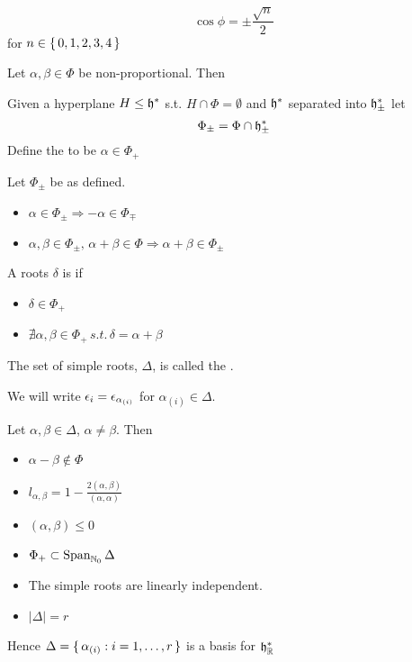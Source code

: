 \documentclass{article}
\begin{document}
\begin{theorem}
	\[
	\cos\phi=\pm\frac{\sqrt{n}}{2}
	\]
	for $n\in\set{  0,1,2,3,4  }$
\end{theorem}
\begin{lemma}
	Let $\alpha,\beta \in \Phi$ be non-proportional. Then 
\end{lemma}

\begin{definition}
	Given a hyperplane $H\leq\mathfrak{h}^\ast$ s.t. $H\cap\Phi=\emptyset$ and $\mathfrak{h}^\ast$ separated into $\mathfrak{h}^\ast_\pm$ let 
	\[
	\Phi_\pm=\Phi\cap\mathfrak{h}^\ast_\pm
	\]
	Define the  to be $\alpha\in\Phi_+$
\end{definition}

\begin{fact} Let $\Phi_\pm$ be as defined.
	\begin{itemize}
		\item $\alpha\in\Phi_\pm \Rightarrow -\alpha\in\Phi_\mp$
		\item $\alpha,\beta\in\Phi_\pm,\, \alpha+\beta\in\Phi \Rightarrow \alpha+\beta\in\Phi_\pm$
	\end{itemize}
\end{fact}

\begin{definition}
	A roots $\delta$ is  if 
	\begin{itemize}
		\item $\delta\in\Phi_+$
		\item $\nexists \alpha,\beta\in\Phi_+ \, s.t. \, \delta=\alpha+\beta$
	\end{itemize}
	The set of simple roots, $\Delta$, is called the .
\end{definition}

\begin{notation}
	We will write $\epsilon_i = \epsilon_{\alpha_{(i)}}$ for $\alpha_{(i)} \in \Delta$. 
\end{notation}

\begin{theorem}
	Let $\alpha,\beta\in\Delta$, $\alpha\neq\beta$. Then
	\begin{itemize}
		\item $\alpha-\beta\notin\Phi$
		\item $l_{\alpha,\beta}=1-\frac{2(\alpha,\beta)}{(\alpha,\alpha)}$
		\item $(\alpha,\beta)\leq0$
		\item $\Phi_+\subset\operatorname{Span}_{\mathbb{N}_0}\Delta$
		\item The simple roots are linearly independent.
		\item $|\Delta|=r$
	\end{itemize}
	Hence $\Delta=\set{  \alpha_{(i)} : i=1,\dots,r  }$ is a basis for $\mathfrak{h}^\ast_{\mathbb{R}}$
\end{theorem}
\end{document}
